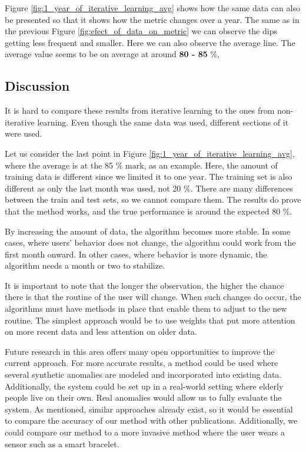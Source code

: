 Figure \ref{fig:1_year_of_iterative_learning_avg} shows how the same data can also be presented so that it shows how the metric changes over a year.
The same as in the previous Figure \ref{fig:efect_of_data_on_metric} we can observe the dips getting less frequent and smaller. 
Here we can also observe the average line. 
The average value seems to be on average at around \textbf{80 - 85} \%,

\subsection{Discussion}

It is hard to compare these results from iterative learning to the ones from non-iterative learning.
Even though the same data was used, different sections of it were used.

Let us consider the last point in Figure \ref{fig:1_year_of_iterative_learning_avg}, where the average is at the 85 \% mark, as an example.
Here, the amount of training data is different since we limited it to one year.
The training set is also different as only the last month was used, not 20 \%.
There are many differences between the train and test sets, so we cannot compare them.
The results do prove that the method works, and the true performance is around the expected 80 \%.

By increasing the amount of data, the algorithm becomes more stable.
In some cases, where users' behavior does not change, the algorithm could work from the first month onward.
In other cases, where behavior is more dynamic, the algorithm needs a month or two to stabilize.

It is important to note that the longer the observation, the higher the chance there is that the routine of the user will change.
When such changes do occur, the algorithms must have methods in place that enable them to adjust to the new routine.
The simplest approach would be to use weights that put more attention on more recent data and less attention on older data.

Future research in this area offers many open opportunities to improve the current approach.
For more accurate results, a method could be used where several synthetic anomalies are modeled and incorporated into existing data.
Additionally, the system could be set up in a real-world setting where elderly people live on their own.
Real anomalies would allow us to fully evaluate the system.
As mentioned, similar approaches already exist, so it would be essential to compare the accuracy of our method with other publications.
Additionally, we could compare our method to a more invasive method where the user wears a sensor such as a smart bracelet.

